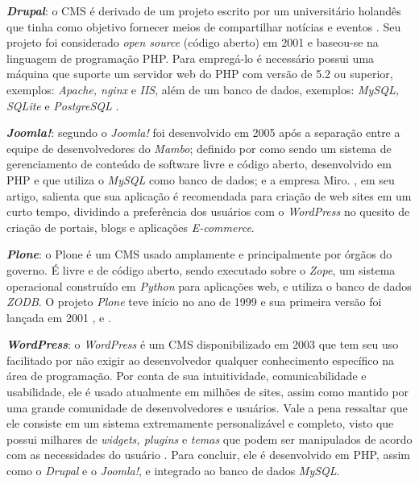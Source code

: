 \textbf{\textit{Drupal}}: o CMS é derivado de um projeto escrito por um universitário holandês que tinha como objetivo fornecer meios de compartilhar notícias e eventos \cite{menezes2016processo}. Seu projeto foi considerado \textit{open source} (código aberto) em 2001 e baseou-se na linguagem de programação PHP. Para empregá-lo é necessário possui uma máquina que suporte um servidor web do PHP com versão de 5.2 ou superior, exemplos: \textit{Apache, nginx} e \textit{IIS}, além de um banco de dados, exemplos: \textit{MySQL, SQLite} e \textit{PostgreSQL} \cite{tomlinson2010beginning}. 

\textbf{\textit{Joomla!}}: segundo  o \textit{Joomla!} foi desenvolvido em 2005 após a separação entre a equipe de desenvolvedores do \textit{Mambo}; definido por  como sendo um sistema de gerenciamento de conteúdo de software livre e código aberto, desenvolvido em PHP e que utiliza o \textit{MySQL} como banco de dados; e a empresa Miro. , em seu artigo, salienta que sua aplicação é recomendada para criação de web sites em um curto tempo, dividindo a preferência dos usuários com o \textit{WordPress} no quesito de criação de portais, blogs e aplicações \textit{E-commerce}.

\textbf{\textit{Plone}}: o Plone é um CMS usado amplamente e principalmente por órgãos do governo. É livre e de código aberto, sendo executado sobre o \textit{Zope}, um sistema operacional construído em \textit{Python} para aplicações web, e utiliza o banco de dados \textit{ZODB}. O projeto \textit{Plone} teve início no ano de 1999 e sua primeira versão foi lançada em 2001 \cite{menezes2016processo}, \cite{elias} e \cite{dasoluccao}.


\textbf{\textit{WordPress}}: o \textit{WordPress} é um CMS disponibilizado em 2003 que tem seu uso facilitado por não exigir ao desenvolvedor qualquer conhecimento específico na área de programação. Por conta de sua intuitividade, comunicabilidade e usabilidade, ele é usado atualmente em milhões de sites, assim como mantido por uma grande comunidade de desenvolvedores e usuários. Vale a pena ressaltar que ele consiste em um sistema extremamente personalizável e completo, visto que possui milhares de \textit{widgets, plugins} e \textit{temas} que podem ser manipulados de acordo com as necessidades do usuário \cite{de2017repositorios}. Para concluir, ele é desenvolvido em PHP, assim como o \textit{Drupal} e o \textit{Joomla!}, e integrado ao banco de dados \textit{MySQL}. 

